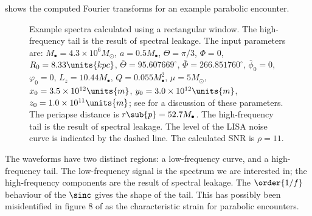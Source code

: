 shows the computed Fourier transforms for an example parabolic encounter.
\begin{figure}[htbp]
  \begin{center} 
    \caption{Example spectra calculated using a rectangular window.  The high-frequency tail is the result of spectral leakage. The input parameters are: $M_\bullet = 4.3 \times 10^6 M_\odot$, $a = 0.5 M_\bullet$, $\Theta = \pi/3$, $\Phi = 0$, $R_0 = 8.33\units{kpc}$, $\overline{\Theta} = {95.607669}^{\circ}$, $\overline{\Phi} = {266.851760}^{\circ}$, $\overline{\phi}_0 = 0$, $\varphi_0 = 0$, $L_z = 10.44 M_\bullet$, $Q = 0.055 M_\bullet^2$, $\mu = 5 M_\odot$, $x_0 = 3.5 \times 10^{12}\units{m}$, $y_0 = 3.0 \times 10^{12}\units{m}$, $z_0 = 1.0 \times 10^{11}\units{m}$; see  for a discussion of these parameters. The periapse distance is $r\sub{p} = 52.7 M_\bullet$. The high-frequency tail is the result of spectral leakage. The level of the LISA noise curve is indicated by the dashed line. The calculated SNR is $\rho = 11$.}
    \label{fig:Rectangular}
  \end{center}
\end{figure}
The waveforms have two distinct regions: a low-frequency curve, and a high-frequency tail. The low-frequency signal is the spectrum we are interested in; the high-frequency components are the result of spectral leakage. The $\order{1/{f}}$ behaviour of the $\sinc$ gives the shape of the tail. This has possibly been misidentified in figure 8 of \citet{Burko2007} as the characteristic strain for parabolic encounters.

